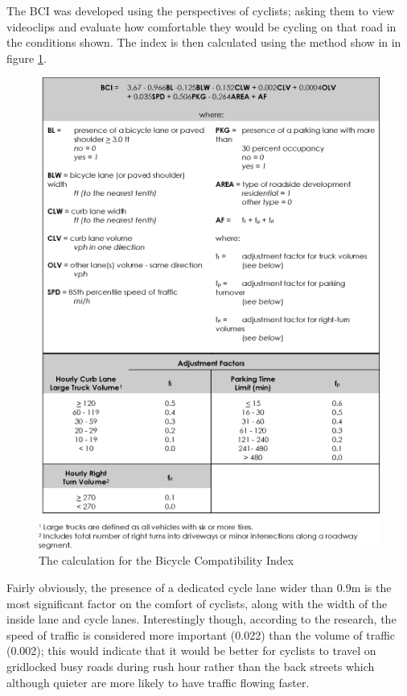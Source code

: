 \documentclass[a4paper]{report}
\begin{document}
The BCI was developed using the perspectives of cyclists; asking them to view videoclips and evaluate how comfortable they would be cycling on that road in the conditions shown. The index is then calculated using the method show in in figure \ref{fig:bci_calc}.
\begin{figure}
\centering
\includegraphics[scale=0.5]{figures/research_report/bci}
\caption{The calculation for the Bicycle Compatibility Index}
\label{fig:bci_calc}
\end{figure}

Fairly obviously, the presence of a dedicated cycle lane wider than 0.9m is the most significant factor on the comfort of cyclists, along with the width of the inside lane and cycle lanes. Interestingly though, according to the research, the speed of traffic is considered more important (0.022) than the volume of traffic (0.002); this would indicate that it would be better for cyclists to travel on gridlocked busy roads during rush hour rather than the back streets which although quieter are more likely to have traffic flowing faster.
\end{document}
